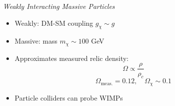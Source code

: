 \documentclass[aspectratio=169,xcolor=dvipsnames,,table,compress]{beamer}
\begin{document}
\begin{frame}
\begin{columns}[T]
\begin{column}{0.5\textwidth}
\begin{center}
        \emph{Weakly Interacting Massive Particles}
      \end{center}
      \begin{itemize}
        \item Weakly: DM-SM coupling $g_\chi \sim g$ 
        \item Massive: mass $m_\chi \sim 100$ GeV
        \item Approximates measured relic density:
          \[\Omega \propto  \frac{\rho}{\rho_{c}}\]
          \[\Omega_\mathrm{meas.} = 0.12, \quad \Omega_\chi \sim 0.1\]
        \item Particle colliders can probe WIMPs
      \end{itemize}
    \end{column}
  \end{columns}
\end{frame}
\end{document}
